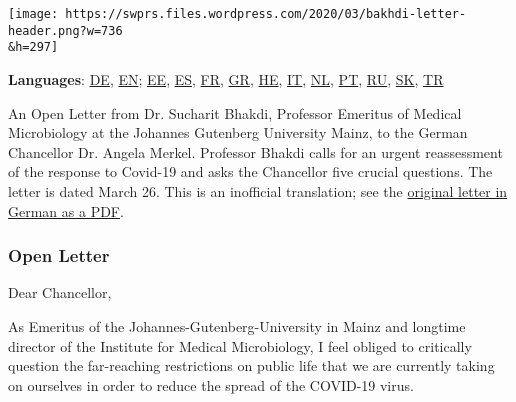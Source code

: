 \texttt{[image: https://swprs.files.wordpress.com/2020/03/bakhdi-letter-header.png?w=736\\\&h=297]}

\textbf{Languages}:
\href{https://swprs.org/offener-brief-von-professor-sucharit-bhakdi-an-bundeskanzlerin-dr-angela-merkel/}{DE},
\href{https://swprs.org/open-letter-from-professor-sucharit-bhakdi-to-german-chancellor-dr-angela-merkel/}{EN};
\href{https://swprs.org/professor-sucharit-bhakdi-avalik-kiri-angela-merkelile/}{EE},
\href{http://piensachile.com/2020/03/carta-abierta-a-angela-merkel/}{ES},
\href{https://swprs.org/covid-19-lettre-ouverte-du-professeur-sucharit-bhakdi-a-la-chanceliere-allemande-dre-angela-merkel/}{FR},
\href{https://swprs.org/professor-bhakdi-open-letter-greek/}{GR},
\href{https://yanivhamo.com/open-letter-from-professor-sucharit-bhakdi-to-german-chancellor-dr-angela-merkel-hebrew/}{HE},
\href{https://swprs.org/lettera-aperta-del-professor-sucharit-bhakdi-al-cancelliere-tedesco-dr-angela-merkel/}{IT},
\href{https://swprs.org/open-brief-van-professor-sucharit-bhakdi-aan-de-duitse-bondskanselier-dr-angela-merkel/}{NL},
\href{https://swprs.org/carta-aberta-do-professor-sucharit-bhakdi-a-chanceler-alema-dra-angela-merkel/}{PT},
\href{https://swprs.org/\%d0\%be\%d1\%82\%d0\%ba\%d1\%80\%d1\%8b\%d1\%82\%d0\%be\%d0\%b5-\%d0\%bf\%d0\%b8\%d1\%81\%d1\%8c\%d0\%bc\%d0\%be-\%d0\%bf\%d1\%80\%d0\%be\%d1\%84\%d0\%b5\%d1\%81\%d1\%81\%d0\%be\%d1\%80\%d0\%b0-\%d1\%81\%d1\%83\%d1\%87\%d0\%b0\%d1\%80\%d0\%b8\%d1\%82\%d0\%b0/}{RU},
\href{https://alatyr.sk/open-letter-from-professor_sk.htm}{SK},
\href{https://swprs.org/prof-dr-sucharit-bhakdiden-basbakan-dr-angela-merkele-acik-mektup/}{TR}

An Open Letter from Dr. Sucharit Bhakdi, Professor Emeritus of Medical
Microbiology at the Johannes Gutenberg University Mainz, to the German
Chancellor Dr. Angela Merkel. Professor Bhakdi calls for an urgent
reassessment of the response to Covid-19 and asks the Chancellor five
crucial questions. The let­ter is dated March 26. This is an inofficial
translation; see the
\href{https://swprs.org/offener-brief-von-professor-sucharit-bhakdi-an-bundeskanzlerin-dr-angela-merkel/}{original
letter in German as a PDF}.

\hypertarget{open-letter}{%
\subsubsection{Open Letter}\label{open-letter}}

Dear Chancellor,

As Emeritus of the Johannes-Gutenberg-University in Mainz and longtime
director of the Institute for Medical Microbiology, I feel obliged to
critically question the far-reaching restrictions on public life that we
are currently taking on ourselves in order to reduce the spread of the
COVID-19 virus.

